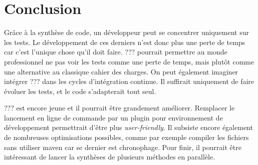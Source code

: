 \chapter*{Conclusion}
	\thispagestyle{conclusion}
	
\par Grâce à la synthèse de code, un développeur peut se concentrer uniquement sur les tests. Le développement de ces derniers n'est donc plus une perte de temps car c'est l'unique chose qu'il doit faire. ??? pourrait permettre au monde professionnel ne pas voir les tests comme une perte de temps, mais plutôt comme une alternative au classique cahier des charges. On peut également imaginer intégrer ??? dans les cycles d'intégration continue. Il suffirait uniquement de faire évoluer les tests, et le code s'adapterait tout seul.

\par ??? est encore jeune et il pourrait être grandement améliorer. Remplacer le lancement en ligne de commande par un plugin pour environnement de développement permettrait d'être plus \textit{user-friendly}. Il subsiste encore également de nombreuses optimisations possibles, comme par exemple compiler les fichiers sans utiliser maven car se dernier est chronophage. Pour finir, il pourrait être intéressant de lancer la synthèses de plusieurs méthodes en parallèle.

\begin{center}
\end{center}
	
	

